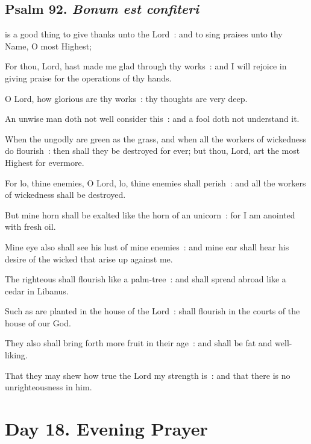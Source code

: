 \subsection{Psalm 92. \textit{Bonum est confiteri}}

 is a good thing to give thanks unto the Lord~: and to sing praises unto thy Name, O most Highest;\par
{}
For thou, Lord, hast made me glad through thy works~: and I will rejoice in giving praise for the operations of thy hands.\par
{}O Lord, how glorious are thy works~: thy thoughts are very deep.\par
{}An unwise man doth not well consider this~: and a fool doth not understand it.\par
{}When the ungodly are green as the grass, and when all the workers of wickedness do flourish~: then shall they be destroyed for ever; but thou, Lord, art the most Highest for evermore.\par
{}For lo, thine enemies, O Lord, lo, thine enemies shall perish~: and all the workers of wickedness shall be destroyed.\par
{}But mine horn shall be exalted like the horn of an unicorn~: for I am anointed with fresh oil.\par
{}Mine eye also shall see his lust of mine enemies~: and mine ear shall hear his desire of the wicked that arise up against me.\par
{}The righteous shall flourish like a palm-tree~: and shall spread abroad like a cedar in Libanus.\par
{}Such as are planted in the house of the Lord~: shall flourish in the courts of the house of our God.\par
{}They also shall bring forth more fruit in their age~: and shall be fat and well-liking.\par
{}That they may shew how true the Lord my strength is~: and that there is no unrighteousness in him.\par

\section*{Day 18. Evening Prayer}

